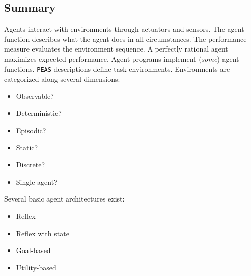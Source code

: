 \subsection{Summary}
Agents interact with environments through actuators and
sensors. The agent function describes what the agent
does in all circumstances. The performance measure
evaluates the environment sequence. A perfectly
rational agent maximizes expected performance. Agent
programs implement (\textit{some}) agent functions. \verb|PEAS|
descriptions define task environments. Environments
are categorized along several dimensions:
\begin{itemize}[label=--, left=1em]
    \item Observable?
    \item Deterministic?
    \item Episodic?
    \item Static?
    \item Discrete?
    \item Single-agent?
\end{itemize}

Several basic agent architectures exist:
\begin{itemize}[label=--, left=1em]
    \item Reflex
    \item Reflex with state
    \item Goal-based
    \item Utility-based
\end{itemize}
